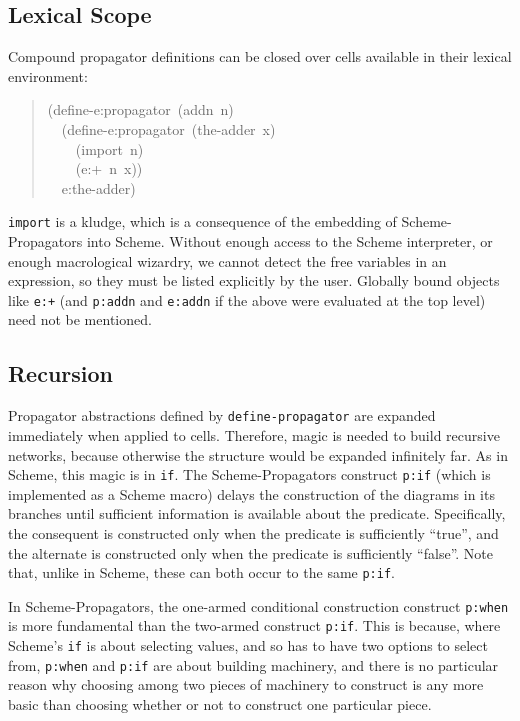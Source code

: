 \documentclass[12pt,letterpaper,english]{article}
\begin{document}

\subsection{Lexical Scope}
\label{lexical-scope}

Compound propagator definitions can be closed over cells available in
their lexical environment:
\begin{quote}{\ttfamily \raggedright \noindent
(define-e:propagator~(addn~n)~\\
~~(define-e:propagator~(the-adder~x)~\\
~~~~(import~n)~\\
~~~~(e:+~n~x))~\\
~~e:the-adder)
}\end{quote}

\texttt{import} is a kludge, which is a consequence of the embedding of
Scheme-Propagators into Scheme.  Without enough access to the Scheme
interpreter, or enough macrological wizardry, we cannot detect the
free variables in an expression, so they must be listed explicitly by
the user.  Globally bound objects like \texttt{e:+} (and \texttt{p:addn} and
\texttt{e:addn} if the above were evaluated at the top level) need not be
mentioned.



\subsection{Recursion}
\label{recursion}

Propagator abstractions defined by \texttt{define-propagator} are expanded
immediately when applied to cells.  Therefore, magic is needed to
build recursive networks, because otherwise the structure would be
expanded infinitely far.  As in Scheme, this magic is in \texttt{if}.  The
Scheme-Propagators construct \texttt{p:if} (which is implemented as a
Scheme macro) delays the construction of the diagrams in its branches
until sufficient information is available about the predicate.
Specifically, the consequent is constructed only when the predicate is
sufficiently ``true'', and the alternate is constructed only when the
predicate is sufficiently ``false''.  Note that, unlike in Scheme, these
can both occur to the same \texttt{p:if}.

In Scheme-Propagators, the one-armed conditional construction
construct \texttt{p:when} is more fundamental than the two-armed construct
\texttt{p:if}.  This is because, where Scheme's \texttt{if} is about selecting
values, and so has to have two options to select from, \texttt{p:when} and
\texttt{p:if} are about building machinery, and there is no particular
reason why choosing among two pieces of machinery to construct is any
more basic than choosing whether or not to construct one particular
piece.
\end{document}

